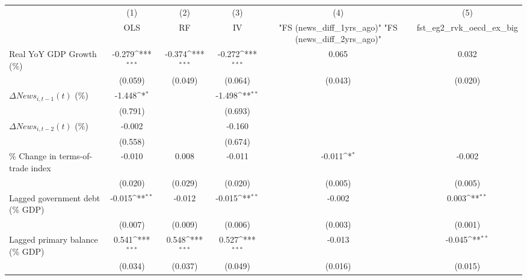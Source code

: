 {
\def\sym#1{\ifmmode^{#1}\else\(^{#1}\)\fi}
\begin{tabular}{l*{5}{c}}
\toprule
                    &\multicolumn{1}{c}{(1)}&\multicolumn{1}{c}{(2)}&\multicolumn{1}{c}{(3)}&\multicolumn{1}{c}{(4)}&\multicolumn{1}{c}{(5)}\\
                    &\multicolumn{1}{c}{OLS}&\multicolumn{1}{c}{RF}&\multicolumn{1}{c}{IV}&\multicolumn{1}{c}{ "FS (news_diff_1yrs_ago)"  "FS (news_diff_2yrs_ago)" }&\multicolumn{1}{c}{fst_eg2_rvk_oecd_ex_big}\\
\midrule
Real YoY GDP Growth (\%)&      -0.279\sym{***}&      -0.374\sym{***}&      -0.272\sym{***}&       0.065         &       0.032         \\
                    &     (0.059)         &     (0.049)         &     (0.064)         &     (0.043)         &     (0.020)         \\
\addlinespace
$ \Delta News_{i,t-1}(t)$ (\%)&      -1.448\sym{*}  &                     &      -1.498\sym{**} &                     &                     \\
                    &     (0.791)         &                     &     (0.693)         &                     &                     \\
\addlinespace
$ \Delta News_{i,t-2}(t)$ (\%)&      -0.002         &                     &      -0.160         &                     &                     \\
                    &     (0.558)         &                     &     (0.674)         &                     &                     \\
\addlinespace
\% Change in terms-of-trade index&      -0.010         &       0.008         &      -0.011         &      -0.011\sym{*}  &      -0.002         \\
                    &     (0.020)         &     (0.029)         &     (0.020)         &     (0.005)         &     (0.005)         \\
\addlinespace
Lagged government debt (\% GDP)&      -0.015\sym{**} &      -0.012         &      -0.015\sym{**} &      -0.002         &       0.003\sym{**} \\
                    &     (0.007)         &     (0.009)         &     (0.006)         &     (0.003)         &     (0.001)         \\
\addlinespace
Lagged primary balance (\% GDP)&       0.541\sym{***}&       0.548\sym{***}&       0.527\sym{***}&      -0.013         &      -0.045\sym{**} \\
                    &     (0.034)         &     (0.037)         &     (0.049)         &     (0.016)         &     (0.015)         \\

\end{tabular}}
